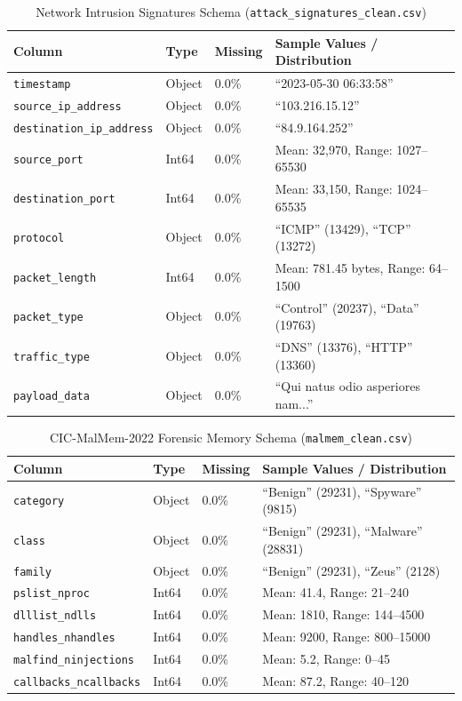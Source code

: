 \documentclass[a4paper, 12pt]{report}
\begin{document}
\begin{table}[h!]
\centering
\small
\caption{Network Intrusion Signatures Schema (\texttt{attack\_signatures\_clean.csv})}
\begin{tabular}{lllp{6cm}}
\toprule
\textbf{Column} & \textbf{Type} & \textbf{Missing} & \textbf{Sample Values / Distribution} \\
\midrule
\texttt{timestamp} & Object & 0.0\% & ``2023-05-30 06:33:58'' \\
\texttt{source\_ip\_address} & Object & 0.0\% & ``103.216.15.12'' \\
\texttt{destination\_ip\_address} & Object & 0.0\% & ``84.9.164.252'' \\
\texttt{source\_port} & Int64 & 0.0\% & Mean: 32,970, Range: 1027--65530 \\
\texttt{destination\_port} & Int64 & 0.0\% & Mean: 33,150, Range: 1024--65535 \\
\texttt{protocol} & Object & 0.0\% & ``ICMP'' (13429), ``TCP'' (13272) \\
\texttt{packet\_length} & Int64 & 0.0\% & Mean: 781.45 bytes, Range: 64--1500 \\
\texttt{packet\_type} & Object & 0.0\% & ``Control'' (20237), ``Data'' (19763) \\
\texttt{traffic\_type} & Object & 0.0\% & ``DNS'' (13376), ``HTTP'' (13360) \\
\texttt{payload\_data} & Object & 0.0\% & ``Qui natus odio asperiores nam...'' \\
\bottomrule
\end{tabular}
\end{table}

\begin{table}[h!]
\centering
\small
\caption{CIC-MalMem-2022 Forensic Memory Schema (\texttt{malmem\_clean.csv})}
\begin{tabular}{lllp{6cm}}
\toprule
\textbf{Column} & \textbf{Type} & \textbf{Missing} & \textbf{Sample Values / Distribution} \\
\midrule
\texttt{category} & Object & 0.0\% & ``Benign'' (29231), ``Spyware'' (9815) \\
\texttt{class} & Object & 0.0\% & ``Benign'' (29231), ``Malware'' (28831) \\
\texttt{family} & Object & 0.0\% & ``Benign'' (29231), ``Zeus'' (2128) \\
\texttt{pslist\_nproc} & Int64 & 0.0\% & Mean: 41.4, Range: 21--240 \\
\texttt{dlllist\_ndlls} & Int64 & 0.0\% & Mean: 1810, Range: 144--4500 \\
\texttt{handles\_nhandles} & Int64 & 0.0\% & Mean: 9200, Range: 800--15000 \\
\texttt{malfind\_ninjections} & Int64 & 0.0\% & Mean: 5.2, Range: 0--45 \\
\texttt{callbacks\_ncallbacks} & Int64 & 0.0\% & Mean: 87.2, Range: 40--120 \\
\bottomrule
\end{tabular}
\end{table}
\end{document}
